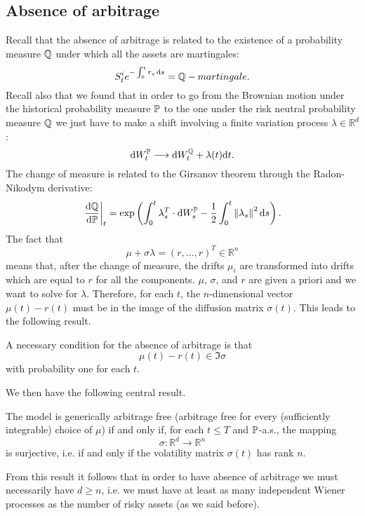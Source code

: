 \subsection{Absence of arbitrage}
Recall that the absence of arbitrage is related to the existence of a probability measure $\mathbb{Q}$ under which all the assets are martingales:
\begin{equation*}
    S^i_t e^{-\int_0^t r_s\,\dd s} = \mathbb{Q}-martingale.
\end{equation*}
Recall also that we found that in order to go from the Brownian motion under the historical probability measure $\mathbb{P}$ to the one under the risk neutral probability measure $\mathbb{Q}$ we just have to make a shift involving a finite variation process $\lambda\in\mathbb{R}^d$:
\begin{equation*}
    \dd W_t^{\mathbb{P}} \longrightarrow \dd W_t^{\mathbb{Q}} + \lambda(t)\dd t.
\end{equation*}
The change of measure is related to the Girsanov theorem through the Radon-Nikodym derivative:
\begin{equation}
    \eval{\dv{\mathbb{Q}}{\mathbb{P}}}_t = \exp\left(\int^t_0 \lambda_s^T\cdot\dd W_s^{\mathbb{P}}-\dfrac{1}{2}\int^t_0 \norm{\lambda_s}^2\,\dd s\right).
\end{equation}
The fact that
\begin{equation}\label{159}
    \mu + \sigma\lambda = (r,\dots,r)^T \in \mathbb{R}^n
\end{equation}
means that, after the change of measure, the drifts $\mu_i$ are transformed into drifts which are equal to $r$ for all the components. $\mu$, $\sigma$, and $r$ are given a priori and we want to solve for $\lambda$. Therefore, for each $t$, the $n$-dimensional vector $\mu(t)-r(t)$ must be in the image of the diffusion matrix $\sigma(t)$. This leads to the following result.
\begin{proposition}
    A necessary condition for the absence of arbitrage is that
    \begin{equation}
        \mu(t) - r(t) \in \Im{\sigma}
    \end{equation}
    with probability one for each $t$.
\end{proposition}
We then have the following central result.
\begin{proposition}
    The model is generically arbitrage free (arbitrage free for every (sufficiently integrable) choice of $\mu$) if and only if, for each $t\le T$ and $\mathbb{P}$-a.s., the mapping
    \begin{equation}
        \sigma: \mathbb{R}^d \to \mathbb{R}^n
    \end{equation}
    is surjective, i.e. if and only if the volatility matrix $\sigma(t)$ has rank $n$.
\end{proposition}
From this result it follows that in order to have absence of arbitrage we must necessarily have $d\ge n$, i.e. we must have at least as many independent Wiener processes as the number of risky assets (as we said before).

